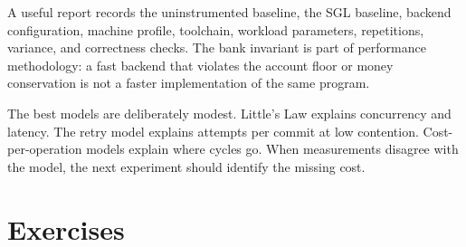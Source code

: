 A useful report records the uninstrumented baseline, the SGL baseline, backend configuration, machine profile, toolchain, workload parameters, repetitions, variance, and correctness checks. The bank invariant is part of performance methodology: a fast backend that violates the account floor or money conservation is not a faster implementation of the same program.

The best models are deliberately modest. Little's Law explains concurrency and latency. The retry model explains attempts per commit at low contention. Cost-per-operation models explain where cycles go. When measurements disagree with the model, the next experiment should identify the missing cost.

\section{Exercises}
